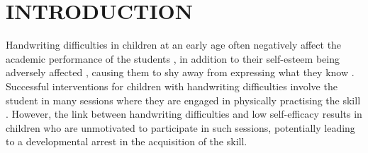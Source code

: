 \documentclass{sig-alternate}
\begin{document}
\section{INTRODUCTION}

Handwriting difficulties in children at an early age often negatively affect
the academic performance of the students \cite{Christensen2005}, in addition to
their self-esteem being adversely affected \cite{Malloy1995}, causing them to
shy away from expressing what they know \cite{Medwell2008}.
Successful interventions for children with handwriting difficulties involve the
student in many sessions where they are engaged in physically practising the
skill \cite{Hoy2011}. However, the link between handwriting difficulties and low
self-efficacy \cite{Engel-Yeger2009} results in children who are unmotivated to
participate in such sessions, potentially leading to a developmental arrest in
the acquisition of the skill. 

\end{document}
